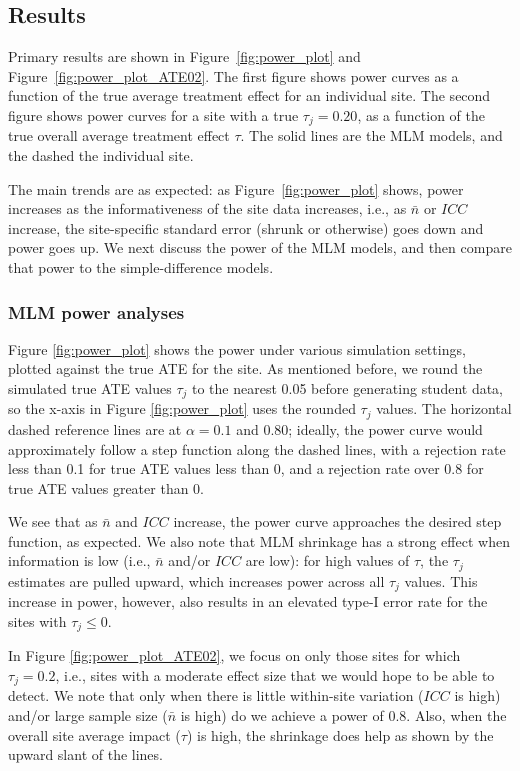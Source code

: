 \documentclass[]{article}
\begin{document}
\subsection{Results}


Primary results are shown in Figure~\ref{fig:power_plot} and Figure~\ref{fig:power_plot_ATE02}.
The first figure shows power curves as a function of the true average treatment effect for an individual site.
The second figure shows power curves for a site with a true $\tau_j = 0.20$, as a function of the true overall average treatment effect $\tau$.
The solid lines are the MLM models, and the dashed the individual site.

The main trends are as expected: as Figure~\ref{fig:power_plot} shows, power increases as the informativeness of the site data increases, i.e., as $\bar{n}$ or $ICC$ increase, the site-specific standard error (shrunk or otherwise) goes down and power goes up.
We next discuss the power of the MLM models, and then compare that power to the simple-difference models.


\subsubsection{MLM power analyses}

Figure \ref{fig:power_plot} shows the power under various simulation settings, plotted against the true ATE for the site.
As mentioned before, we round the simulated true ATE values $\tau_j$ to the nearest 0.05 before generating student data, so the x-axis in Figure \ref{fig:power_plot} uses the rounded $\tau_j$ values.
The horizontal dashed reference lines are at $\alpha = 0.1$ and $0.80$; ideally, the power curve would approximately follow a step function along the dashed lines, with a rejection rate less than 0.1 for true ATE values less than 0, and a rejection rate over 0.8 for true ATE values greater than 0.

We see that as $\bar{n}$ and $ICC$ increase, the power curve approaches the desired step function, as expected.
We also note that MLM shrinkage has a strong effect when information is low (i.e., $\bar{n}$ and/or $ICC$ are low): for high values of $\tau$, the $\tau_j$ estimates are pulled upward, which increases power across all $\tau_j$ values.
This increase in power, however, also results in an elevated type-I error rate for the sites with $\tau_j \leq 0$.


In Figure \ref{fig:power_plot_ATE02}, we focus on only those sites for which $\tau_j = 0.2$, i.e., sites with a moderate effect size that we would hope to be able to detect.
We note that only when there is little within-site variation ($ICC$ is high) and/or large sample size ($\bar{n}$ is high) do we achieve a power of 0.8.
Also, when the overall site average impact ($\tau$) is high, the shrinkage does help as shown by the upward slant of the lines.
\end{document}
